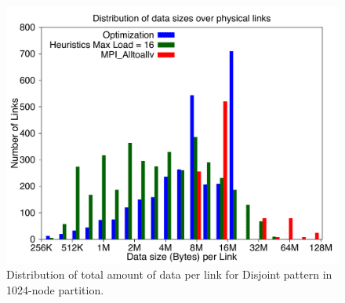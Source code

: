 \begin{figure}[!htbp]
\vspace{-0.15in}
\centering
\includegraphics[scale=0.27]{figures/loaddata_histo.pdf}
\vspace{-0.15in}
\caption{\small Distribution of total amount of data per link for Disjoint pattern in 1024-node partition.}
\vspace{-0.15in}
\label{fig:loaddata_histo}
\end{figure}
